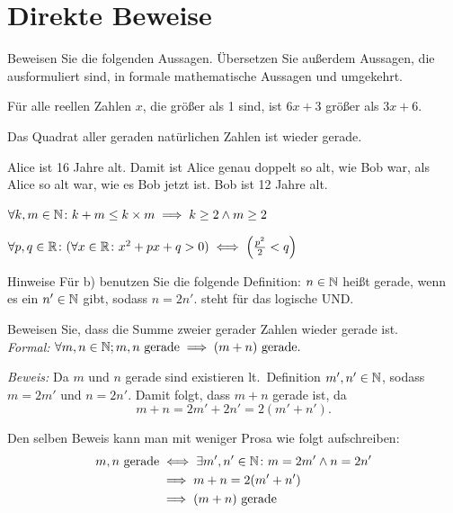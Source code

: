 \documentclass{scrartcl}
\begin{document}
\maketitle

\section{Direkte Beweise}
Beweisen Sie die folgenden Aussagen. 
Übersetzen Sie außerdem Aussagen, die ausformuliert sind, in formale mathematische Aussagen und umgekehrt.
\begin{subex}
  \item Für alle reellen Zahlen $x$, die größer als 1 sind, ist $6x + 3$ größer als $3x + 6$.
  \item Das Quadrat aller geraden natürlichen Zahlen ist wieder gerade.
  \item Alice ist 16 Jahre alt. Damit ist Alice genau doppelt so alt, wie Bob war, als Alice so alt war, wie es Bob jetzt ist. Bob ist 12 Jahre alt.
  \item $\forall k, m \in \mathbb{N}\colon k + m \le k \times m \implies k \ge 2 \land m \ge 2$
  \item $\forall p, q \in \mathbb{R}\colon (\forall x \in \mathbb{R}\colon x^2 + px + q > 0) \iff \left( \frac{p^2}{2} < q \right)$ 
\end{subex}

\begin{remark}{Hinweise}
  Für b) benutzen Sie die folgende Definition: $n \in \mathbb{N}$ heißt gerade, wenn es ein $n' \in \mathbb{N}$ gibt, sodass $n = 2n'$. 
  \quotes{$\land$} steht für das logische UND.
\end{remark}

\begin{solution}[Beispiel]
  Beweisen Sie, dass die Summe zweier gerader Zahlen wieder gerade ist.\\

  \emph{Formal:} $\forall m, n \in \mathbb{N}; m, n \mbox{ gerade} \implies (m + n) \mbox{ gerade}.$

  \emph{Beweis:} Da $m$ und $n$ gerade sind existieren lt.\ Definition $m', n' \in \mathbb{N}$, sodass $m = 2m'$ und $n = 2n'$. Damit folgt, dass $m + n$ gerade ist, da
  \[
    m + n = 2m' + 2n' = 2 (m' + n').
  \] 

  Den selben Beweis kann man mit weniger Prosa wie folgt aufschreiben:
  \begin{align*}
    m, n \mbox{ gerade} 
    &\iff \exists m', n' \in \NN\colon m = 2m' \land n = 2n' \\
    &\implies m + n = 2 (m' + n') \\
    &\implies (m + n) \mbox{ gerade}
  \end{align*}
\end{solution}
\end{document}
